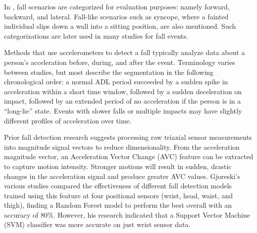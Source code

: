 \documentclass{llncs}
\begin{document}
    In \cite{noury2007principles}, fall scenarios are categorized for evaluation purposes: namely forward, backward, and lateral. Fall-like scenarios such as syncope, where a fainted individual slips down a wall into a sitting position, are also mentioned. Such categorizations are later used in many studies for fall events.
     
    Methods that use accelerometers to detect a fall typically analyze data about a person's acceleration before, during, and after the event. Terminology varies between studies, but most describe the segmentation in the following chronological order: a normal ADL period succeeded by a sudden spike in acceleration within a short time window, followed by a sudden deceleration on impact, followed by an extended period of no acceleration if the person is in a ``long-lie'' state. Events with slower falls or multiple impacts may have slightly different profiles of acceleration over time.\cite{kangas2009sensitivity}
    
    Prior fall detection research suggests processing raw triaxial sensor measurements into magnitude signal vectors to reduce dimensionality. From the acceleration magnitude vector, an Acceleration Vector Change (AVC) feature can be extracted to capture motion intensity. Stronger motions will result in sudden, drastic changes in the acceleration signal and produce greater AVC values.\cite{gjoreski2016accurately} Gjoreski's various studies compared the effectiveness of different fall detection models trained using this feature at four positional sensors (wrist, head, waist, and thigh), finding a Random Forest model to perform the best overall with an accuracy of 80\%. However, his research indicated that a Support Vector Machine (SVM) classifier was more accurate on just wrist sensor data. 
 
 
\end{document}
